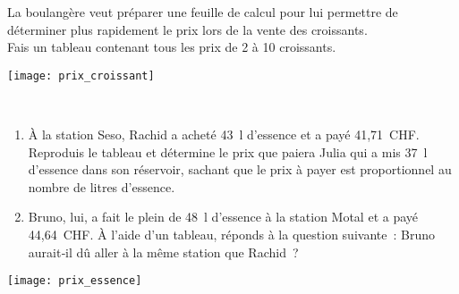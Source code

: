 \begin{activite}

\begin{partie}[À la boulangerie]
\begin{minipage}[c]{0.68\linewidth}
La boulangère veut préparer une feuille de calcul pour lui permettre de déterminer plus rapidement le prix lors de la vente des croissants. \\[0.5em]
Fais un tableau contenant tous les prix de 2 à 10 croissants.
 \end{minipage} \hfill%
 \begin{minipage}[c]{0.28\linewidth}
  \texttt{[image: prix\_croissant]}
  \end{minipage} \\
\end{partie}

\begin{partie}
\begin{minipage}[c]{0.68\linewidth}
\begin{enumerate}
 \item À la station Seso, Rachid a acheté 43 l d'essence et a payé 41,71 CHF. Reproduis le tableau et détermine le prix que paiera Julia qui a mis 37 l d'essence dans son réservoir, sachant que le prix à payer est proportionnel au nombre de litres d'essence.
 \item Bruno, lui, a fait le plein de 48 l d'essence à la station Motal et a payé 44,64 CHF. À l'aide d'un tableau, réponds à la question suivante : Bruno aurait‑il dû aller à la même station que Rachid ?
 \end{enumerate}
 \end{minipage} \hfill%
 \begin{minipage}[c]{0.28\linewidth}
  \texttt{[image: prix\_essence]}
  \end{minipage} \\
\end{partie}

\end{activite}



